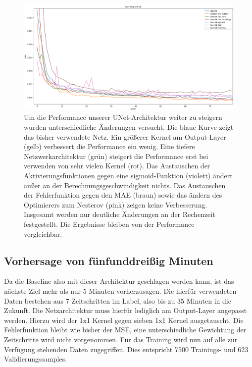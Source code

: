 \begin{figure}[h]
	\centering
	\includegraphics[width=\linewidth]{pics/vgl_lc_optim.png}
	\caption[Verschiedene UNet-Optimierungen im Vergleich]{Um die Performance unserer UNet-Architektur weiter zu steigern wurden unterschiedliche Änderungen versucht. Die blaue Kurve zeigt das bisher verwendete Netz. Ein größerer Kernel am Output-Layer (gelb) verbessert die Performance ein wenig. Eine tiefere Netzwerkarchitektur (grün) steigert die Performance erst bei verwenden von sehr vielen Kernel (rot). Das Austauschen der Aktivierungsfunktionen gegen eine sigmoid-Funktion (violett) ändert außer an der Berechnungsgeschwindigkeit nichts. Das Austauschen der Fehlerfunktion gegen den MAE (braun) sowie das ändern des Optimierers zum Nesterov (pink) zeigen keine Verbesserung. Insgesamt werden nur deutliche Änderungen an der Rechenzeit festgestellt. Die Ergebnisse bleiben von der Performance vergleichbar.}
	\label{lc_unet_types}
\end{figure}

\subsection{Vorhersage von fünfunddreißig Minuten}
Da die Baseline also mit dieser Architektur geschlagen werden kann, ist das nächste Ziel mehr als nur 5 Minuten vorherzusagen. Die hierfür verwendeten Daten bestehen aus 7 Zeitschritten im Label, also bis zu 35 Minuten in die Zukunft. Die Netzarchitektur muss hierfür lediglich am Output-Layer angepasst werden. Hierzu wird der 1x1 Kernel gegen sieben 1x1 Kernel ausgetauscht. Die Fehlerfunktion bleibt wie bisher der MSE, eine unterschiedliche Gewichtung der Zeitschritte wird nicht vorgenommen.
Für das Training wird nun auf alle zur Verfügung stehenden Daten zugegriffen. Dies entspricht 7500 Trainings- und 623 Validierungssamples.


